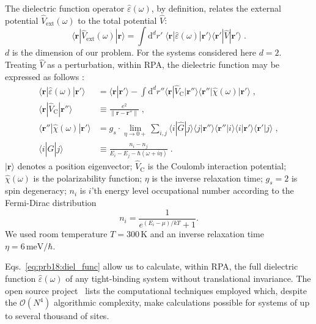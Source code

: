 The dielectric function operator $\hat\varepsilon(\omega)$, by definition, relates the external potential $\hat V_\text{ext}(\omega)$ to the total potential $\hat V$:
\begin{equation}
    \langle\mathbf{r}| \hat V_\text{ext}(\omega) |\mathbf{r}\rangle
        = \int\!\! \text{d}^d r' \; \langle\mathbf{r}| \hat\varepsilon(\omega)
            |\mathbf{r'}\rangle \langle\mathbf{r'}| \hat V |\mathbf{r'}\rangle
    \;.
\end{equation}
$d$ is the dimension of our problem. For the systems considered here $d = 2$. Treating $\hat V$ as a perturbation, within RPA, the dielectric function may be expressed as follows \cite{Vonsov2012QuantumSolidS}:
\begin{equation}\label{eq:prb18:diel_func}
\begin{aligned}
    \langle\mathbf{r}| \hat\varepsilon(\omega) |\mathbf{r'}\rangle
        &= \langle\mathbf{r}|\mathbf{r'}\rangle
        \!-\!\!\!
        \int\!\! \text{d}^d r'' \langle\mathbf{r}| \hat V_\text{C}
            |\mathbf{r''}\rangle \langle\mathbf{r''}| \hat\chi(\omega)
            |\mathbf{r'}\rangle \;, \\
    \langle\mathbf{r}| \hat V_\text{C} |\mathbf{r''}\rangle
        &\equiv \frac{e^2}{\|\mathbf{r} - \mathbf{r''}\|} \;, \\
    \langle\mathbf{r''}| \hat\chi(\omega) |\mathbf{r'}\rangle
    &= g_s \cdot\! \lim_{\eta \to 0+} \sum_{i,j}
            \langle i| \hat G |j\rangle
            \langle j|\mathbf{r''}\rangle \langle\mathbf{r''} |i\rangle
            \langle i|\mathbf{r'}\rangle \langle\mathbf{r'} |j\rangle \;, \\
    \langle i| \hat G |j\rangle
        &\equiv \frac{n_i - n_j}{E_i - E_j - \hbar(\omega + i\eta)} \;.
\end{aligned}
\end{equation}
$|\mathbf{r}\rangle$ denotes a position eigenvector; $\hat V_\text{C}$ is the Coulomb interaction potential; $\hat\chi(\omega)$ is the polarizability function; $\eta$ is the inverse relaxation time; $g_s = 2$ is spin degeneracy; $n_i$ is $i$'th energy level occupational number according to the Fermi-Dirac distribution
\begin{equation}
    n_i = \frac{1}{e^{(E_i - \mu)/kT} + 1}.
\end{equation}
We used room temperature $T=300\,\text{K}$ and an inverse relaxation time $\eta = 6\,\text{meV/}\hbar$.

Eqs.~\eqref{eq:prb18:diel_func} allow us to calculate, within RPA, the full dielectric function $\hat\varepsilon(\omega)$ of any tight-binding system without translational invariance. The open source project~\cite{Westerhout2017} lists the computational techniques employed which, despite the $\mathcal{O}(N^4)$ algorithmic complexity, make calculations possible for systems of up to several thousand of sites.

